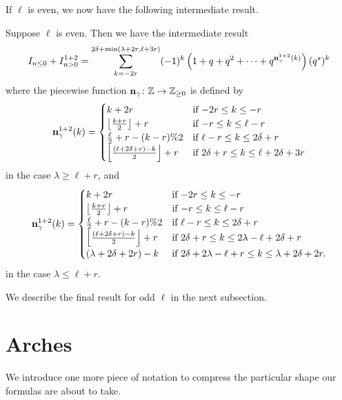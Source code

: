 If $\ell$ is even, we now have the following intermediate result.
\begin{proposition}
  Suppose $\ell$ is even.
  Then we have the intermediate result
  \[
    I_{n \le 0} + I_{n > 0}^{\text{1+2}}
    = \sum_{k = -2r}^{2\delta + \min(\lambda+2r, \ell+3r)}
    (-1)^k \left( 1 + q + q^2 + \dots + q^{\mathbf n^{1+2}_{\gamma}(k)}  \right) (q^s)^k
  \]
  where the piecewise function $\mathbf n_\gamma \colon \mathbb Z \to \mathbb Z_{\ge 0}$ is defined by
  \[
    \mathbf n^{1+2}_\gamma(k) =
    \begin{cases}
      k + 2r & \text{if } {-2r} \le k \le -r \\
      \left\lfloor \frac{k+r}{2} \right\rfloor + r & \text{if }{-r} \le k \le \ell-r \\
      \frac{\ell}{2} + r - (k-r)\%2 & \text{if } \ell - r \le k \le 2\delta + r \\
      \left\lfloor \frac{(\ell+2\delta+r)-k}{2} \right\rfloor + r & \text{if } 2\delta + r \le k \le \ell + 2\delta + 3r
    \end{cases}
  \]
  in the case $\lambda \ge \ell+r$, and
  \[
    \mathbf n^{1+2}_\gamma(k) =
    \begin{cases}
      k + 2r & \text{if } {-2r} \le k \le -r \\
      \left\lfloor \frac{k+r}{2} \right\rfloor + r & \text{if }{-r} \le k \le \ell-r \\
      \frac{\ell}{2} + r - (k-r) \% 2 & \text{if } \ell - r \le k \le 2\delta + r \\
      \left\lfloor \frac{(\ell+2\delta+r)-k}{2} \right\rfloor + r & \text{if } 2\delta + r \le k \le 2\lambda - \ell + 2\delta + r \\
      (\lambda + 2\delta + 2r) - k & \text{if } 2 \delta + 2 \lambda - \ell + r \le k \le \lambda + 2\delta + 2r.
    \end{cases}
  \]
  in the case $\lambda \le \ell+r$.
\end{proposition}

We describe the final result for odd $\ell$ in the next subsection.

\section{Arches}
We introduce one more piece of notation to compress
the particular shape our formulas are about to take.

